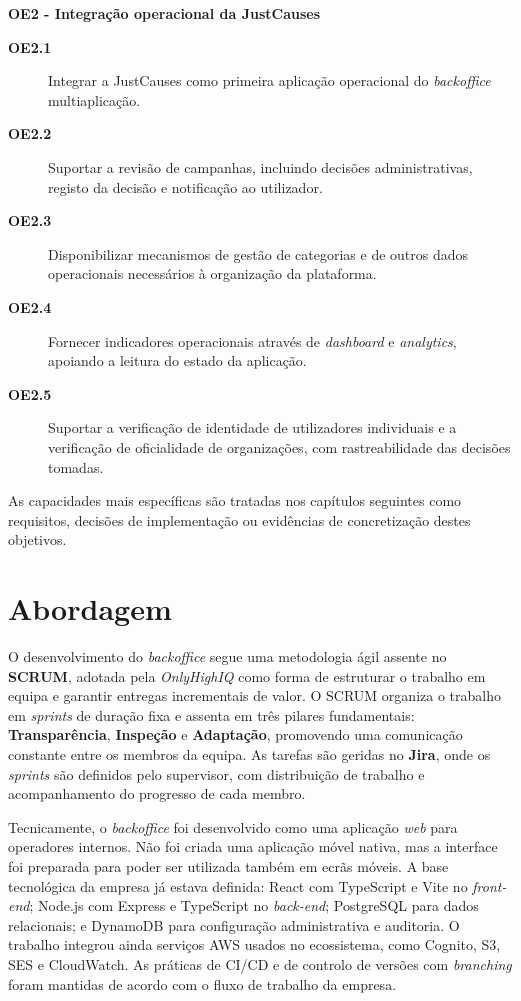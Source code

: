 \textbf{OE2 - Integração operacional da JustCauses}
\begin{description}
    \item[\textbf{OE2.1}] Integrar a JustCauses como primeira aplicação operacional do \textit{backoffice} multiaplicação.
    \item[\textbf{OE2.2}] Suportar a revisão de campanhas, incluindo decisões administrativas, registo da decisão e notificação ao utilizador.
    \item[\textbf{OE2.3}] Disponibilizar mecanismos de gestão de categorias e de outros dados operacionais necessários à organização da plataforma.
    \item[\textbf{OE2.4}] Fornecer indicadores operacionais através de \textit{dashboard} e \textit{analytics}, apoiando a leitura do estado da aplicação.
    \item[\textbf{OE2.5}] Suportar a verificação de identidade de utilizadores individuais e a verificação de oficialidade de organizações, com rastreabilidade das decisões tomadas.
\end{description}

As capacidades mais específicas são tratadas nos capítulos seguintes como requisitos, decisões de implementação ou evidências de concretização destes objetivos.


\section{Abordagem}

O desenvolvimento do \textit{backoffice} segue uma metodologia ágil assente no \textbf{SCRUM}, adotada pela \textit{OnlyHighIQ} como forma de estruturar o trabalho em equipa e garantir entregas incrementais de valor. O SCRUM organiza o trabalho em \textit{sprints} de duração fixa e assenta em três pilares fundamentais: \textbf{Transparência}, \textbf{Inspeção} e \textbf{Adaptação}, promovendo uma comunicação constante entre os membros da equipa. \cite{Sachdeva2016Scrum} As tarefas são geridas no \textbf{Jira}, onde os \textit{sprints} são definidos pelo supervisor, com distribuição de trabalho e acompanhamento do progresso de cada membro.

Tecnicamente, o \textit{backoffice} foi desenvolvido como uma aplicação \textit{web} para operadores internos. Não foi criada uma aplicação móvel nativa, mas a interface foi preparada para poder ser utilizada também em ecrãs móveis. A base tecnológica da empresa já estava definida: React com TypeScript e Vite no \textit{front-end}; Node.js com Express e TypeScript no \textit{back-end}; \gls{PostgreSQL} para dados relacionais; e DynamoDB para configuração administrativa e auditoria. O trabalho integrou ainda serviços \gls{AWS} usados no ecossistema, como Cognito, S3, \gls{SES} e CloudWatch. As práticas de \gls{CI/CD} e de controlo de versões com \textit{branching} foram mantidas de acordo com o fluxo de trabalho da empresa.

